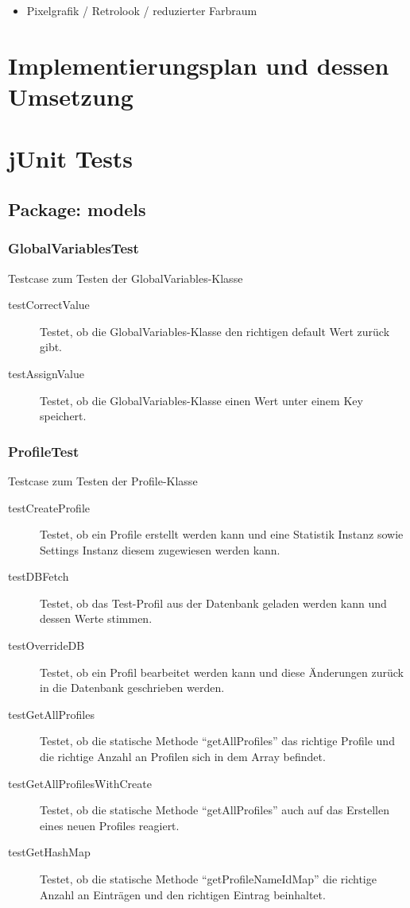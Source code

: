 \documentclass[parskip=full]{scrreprt}
\begin{document}
\begin{itemize}
	\item Pixelgrafik / Retrolook / reduzierter Farbraum
\end{itemize}

\chapter{Implementierungsplan und dessen Umsetzung}

\chapter{jUnit Tests}

\section{Package: models}

\subsection{GlobalVariablesTest}

Testcase zum Testen der GlobalVariables-Klasse

\begin{description}
\item[testCorrectValue]
	Testet, ob die GlobalVariables-Klasse den richtigen default Wert zurück gibt.
\item[testAssignValue]
	Testet, ob die GlobalVariables-Klasse einen Wert unter einem Key speichert.
\end{description}

\subsection{ProfileTest}

Testcase zum Testen der Profile-Klasse

\begin{description}
	\item[testCreateProfile] Testet, ob ein Profile erstellt werden kann und eine Statistik Instanz sowie Settings Instanz diesem zugewiesen werden kann.
	\item[testDBFetch] Testet, ob das Test-Profil aus der Datenbank geladen werden kann und dessen Werte stimmen.
	\item[testOverrideDB] Testet, ob ein Profil bearbeitet werden kann und diese Änderungen zurück in die Datenbank geschrieben werden.
	\item[testGetAllProfiles] Testet, ob die statische Methode \enquote{getAllProfiles} das richtige Profile und die richtige Anzahl an Profilen sich in dem Array befindet.
	\item[testGetAllProfilesWithCreate] Testet, ob die statische Methode \enquote{getAllProfiles} auch auf das Erstellen eines neuen Profiles reagiert.
	\item[testGetHashMap] Testet, ob die statische Methode \enquote{getProfileNameIdMap} die richtige Anzahl an Einträgen und den richtigen Eintrag beinhaltet.
\end{description}
\end{document}
